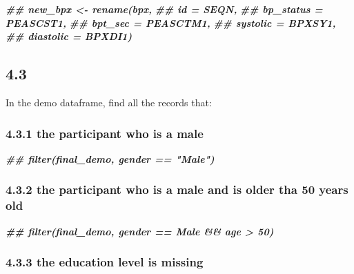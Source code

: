 \documentclass[
]{book}
\newenvironment{Shaded}{\begin{snugshade}}{\end{snugshade}}
\newcommand{\DocumentationTok}[1]{\textcolor[rgb]{0.56,0.35,0.01}{\textbf{\textit{#1}}}}
\begin{document}
\begin{Shaded}
\begin{Highlighting}[]
\DocumentationTok{\#\# new\_bpx \textless{}{-} rename(bpx,}
\DocumentationTok{\#\#                    id = SEQN,}
\DocumentationTok{\#\#                    bp\_status = PEASCST1,}
\DocumentationTok{\#\#                    bpt\_sec = PEASCTM1,}
\DocumentationTok{\#\#                    systolic = BPXSY1,}
\DocumentationTok{\#\#                    diastolic = BPXDI1)}
\end{Highlighting}
\end{Shaded}

\hypertarget{section-19}{%
\subsection{4.3}\label{section-19}}

In the demo dataframe, find all the records that:

\hypertarget{the-participant-who-is-a-male}{%
\subsubsection{4.3.1 the participant who is a male}\label{the-participant-who-is-a-male}}

\begin{Shaded}
\begin{Highlighting}[]
\DocumentationTok{\#\# filter(final\_demo, gender == "Male")}
\end{Highlighting}
\end{Shaded}

\hypertarget{the-participant-who-is-a-male-and-is-older-tha-50-years-old}{%
\subsubsection{4.3.2 the participant who is a male and is older tha 50 years old}\label{the-participant-who-is-a-male-and-is-older-tha-50-years-old}}

\begin{Shaded}
\begin{Highlighting}[]
\DocumentationTok{\#\# filter(final\_demo, gender == \textquotesingle{}Male\textquotesingle{} \&\& age \textgreater{} 50)}
\end{Highlighting}
\end{Shaded}

\hypertarget{the-education-level-is-missing}{%
\subsubsection{4.3.3 the education level is missing}\label{the-education-level-is-missing}}
\end{document}
